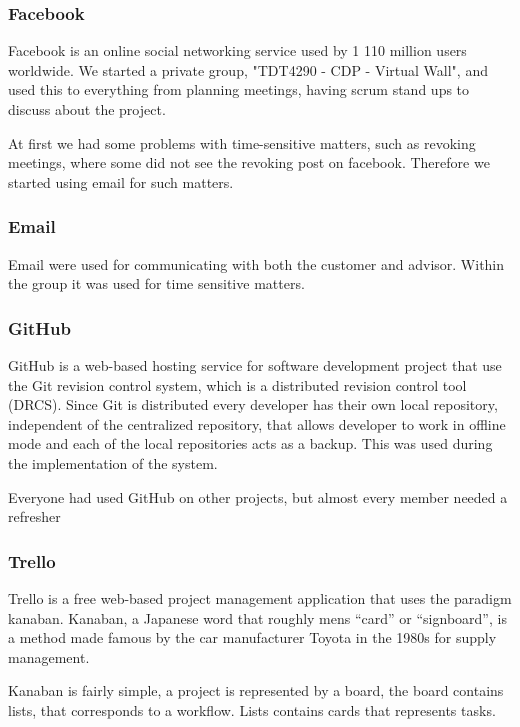 \documentclass[11pt]{book}
\begin{document}
\subsubsection{Facebook}
Facebook is an online social networking service used by 1 110 million users worldwide\cite{facebook}. We started a private group, "TDT4290 - CDP - Virtual Wall", and used this to everything from planning meetings, having scrum stand ups to discuss about the project. 

At first we had some problems with time-sensitive matters, such as revoking meetings, where some did not see the revoking post on facebook. Therefore we started using email for such matters.

\subsubsection{Email}
Email were used for communicating with both the customer and advisor. Within the group it was used for time sensitive matters.

\subsubsection{GitHub}
GitHub\cite{github} is a web-based hosting service for software development project that use the Git revision control system, which is a distributed revision control tool (DRCS). Since Git is distributed every developer has their own local repository, independent of the centralized repository, that allows developer to work in offline mode and each of the local repositories acts as a backup. This was used during the implementation of the system.

Everyone had used GitHub on other projects, but almost every member needed a refresher

\subsubsection{Trello}
Trello\cite{trello} is a free web-based project management application that uses the paradigm kanaban. Kanaban, a Japanese word that roughly mens ``card'' or ``signboard'', is a method made famous by the car manufacturer Toyota in the 1980s for supply management. 

Kanaban is fairly simple, a project is represented by a board, the board contains lists, that corresponds to a workflow. Lists contains cards that represents tasks.
\end{document}
